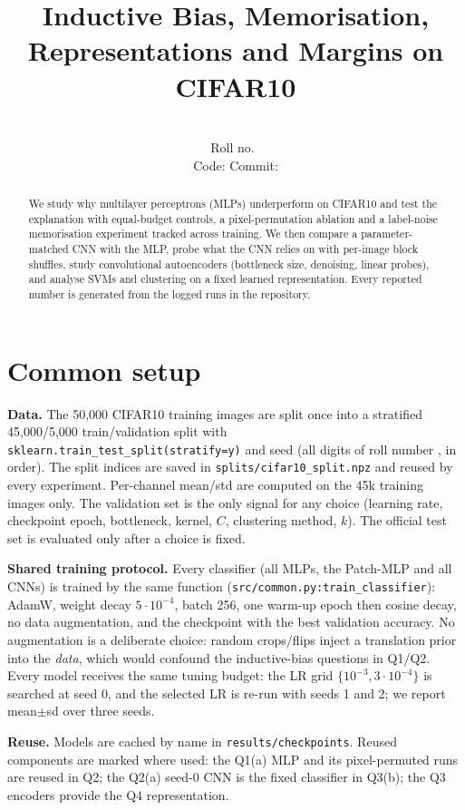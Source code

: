 \documentclass[10pt,twocolumn,letterpaper]{article}
\title{Inductive Bias, Memorisation, Representations and Margins on CIFAR10}
\author{\StudentName\\ Roll no.\ \RollNumber\\ {\small Code: \RepoURL\quad Commit: \texttt{\CommitHash}}}
\date{}
\begin{document}
\maketitle

\begin{abstract}
We study why multilayer perceptrons (MLPs) underperform on CIFAR10 and test the explanation with equal-budget
controls, a pixel-permutation ablation and a label-noise memorisation experiment tracked across training.
We then compare a parameter-matched CNN with the MLP, probe what the CNN relies on with per-image block shuffles,
study convolutional autoencoders (bottleneck size, denoising, linear probes), and analyse SVMs and clustering on a
fixed learned representation. Every reported number is generated from the logged runs in the repository.
\end{abstract}

\section{Common setup}
\textbf{Data.} The 50{,}000 CIFAR10 training images are split once into a stratified 45{,}000/5{,}000 train/validation
split with \texttt{sklearn.train\_test\_split(stratify=y)} and seed \SplitSeed{} (all digits of roll number \RollNumber,
in order). The split indices are saved in \texttt{splits/cifar10\_split.npz} and reused by every experiment.
Per-channel mean/std are computed on the 45k training images only. The validation set is the only signal for any choice
(learning rate, checkpoint epoch, bottleneck, kernel, $C$, clustering method, $k$). The official test set is evaluated
only after a choice is fixed.

\textbf{Shared training protocol.} Every classifier (all MLPs, the Patch-MLP and all CNNs) is trained by the same function
(\texttt{src/common.py:train\_classifier}): AdamW, weight decay $5\cdot10^{-4}$, batch 256, one warm-up epoch then cosine
decay, no data augmentation, and the checkpoint with the best validation accuracy. No augmentation is a deliberate choice:
random crops/flips inject a translation prior into the \emph{data}, which would confound the inductive-bias questions in
Q1/Q2. Every model receives the same tuning budget: the LR grid $\{10^{-3},3\cdot10^{-4}\}$ is searched at seed 0, and
the selected LR is re-run with seeds 1 and 2; we report mean$\pm$sd over three seeds.

\textbf{Reuse.} Models are cached by name in \texttt{results/checkpoints}. Reused components are marked where used:
the Q1(a) MLP and its pixel-permuted runs are reused in Q2; the Q2(a) seed-0 CNN is the fixed classifier in Q3(b);
the Q3 encoders provide the Q4 representation.
\end{document}
